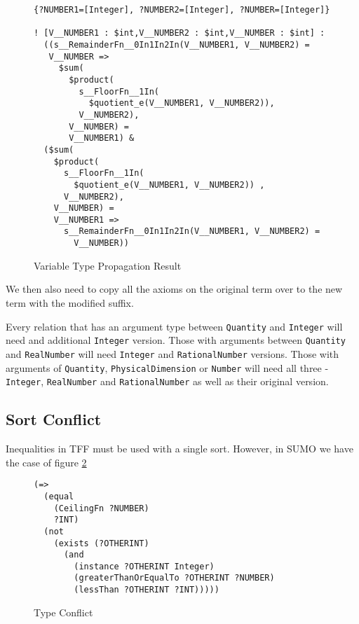 \documentclass{article}
\begin{document}
\begin{figure}[H]
\begin{framed}
\begin{verbatim}
{?NUMBER1=[Integer], ?NUMBER2=[Integer], ?NUMBER=[Integer]}

! [V__NUMBER1 : $int,V__NUMBER2 : $int,V__NUMBER : $int] : 
  ((s__RemainderFn__0In1In2In(V__NUMBER1, V__NUMBER2) = 
   V__NUMBER => 
     $sum(
       $product(
         s__FloorFn__1In(
           $quotient_e(V__NUMBER1, V__NUMBER2)),
         V__NUMBER2),
       V__NUMBER) = 
       V__NUMBER1) &
  ($sum(
    $product(
      s__FloorFn__1In(
        $quotient_e(V__NUMBER1, V__NUMBER2)) ,
      V__NUMBER2),
    V__NUMBER) = 
    V__NUMBER1 => 
      s__RemainderFn__0In1In2In(V__NUMBER1, V__NUMBER2) = 
        V__NUMBER))
\end{verbatim}
\end{framed}
\caption{Variable Type Propagation Result}
\label{fig:VarPropRes}
\end{figure}

We then also need to copy all the axioms on the original term over to the new
term with the modified suffix.

Every relation that has an argument type between \texttt{Quantity} and
\texttt{Integer} will need and additional \texttt{Integer} version.  Those with
arguments between \texttt{Quantity} and \texttt{RealNumber} will need
\texttt{Integer} and \texttt{RationalNumber} versions. Those with arguments of
\texttt{Quantity}, \texttt{PhysicalDimension} or \texttt{Number} will need all
three - \texttt{Integer}, \texttt{RealNumber} and \texttt{RationalNumber} as
well as their original version.

\subsection{Sort Conflict}

Inequalities in TFF must be used with a single sort.  However, in SUMO we have the 
case of figure \ref{fig:TypeConflict}

\begin{figure}[H]
\begin{framed}
\begin{verbatim}
(=> 
  (equal 
    (CeilingFn ?NUMBER) 
    ?INT) 
  (not 
    (exists (?OTHERINT) 
      (and 
        (instance ?OTHERINT Integer) 
        (greaterThanOrEqualTo ?OTHERINT ?NUMBER) 
        (lessThan ?OTHERINT ?INT)))))
\end{verbatim}
\end{framed}
\caption{Type Conflict}
\label{fig:TypeConflict}
\end{figure}
\end{document}
